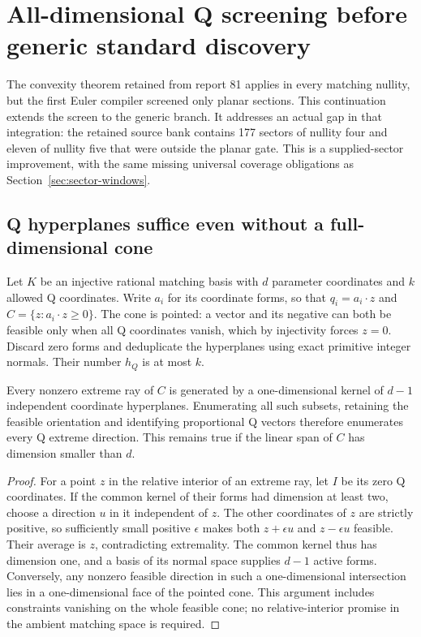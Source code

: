 \section{All-dimensional Q screening before generic standard discovery}
\label{sec:generic-euler}

The convexity theorem retained from report 81 applies in every matching
nullity, but the first Euler compiler screened only planar sections.
This continuation extends the screen to the generic branch. It addresses
an actual gap in that integration: the retained source bank contains 177
sectors of nullity four and eleven of nullity five that were outside the
planar gate. This is a supplied-sector improvement, with the same missing
universal coverage obligations as Section~\ref{sec:sector-windows}.

\subsection{Q hyperplanes suffice even without a full-dimensional cone}

Let $K$ be an injective rational matching basis with $d$ parameter coordinates
and $k$ allowed Q coordinates. Write $a_i$ for its coordinate forms, so that
$q_i=a_i\cdot z$ and $C=\{z:a_i\cdot z\ge0\}$.
The cone is pointed: a vector and its negative can both be feasible only
when all Q coordinates vanish, which by injectivity forces $z=0$.
Discard zero forms and deduplicate the hyperplanes using exact primitive
integer normals. Their number $h_Q$ is at most $k$.

\begin{proposition}
Every nonzero extreme ray of $C$ is generated by a one-dimensional kernel
of $d-1$ independent coordinate hyperplanes. Enumerating all such subsets,
retaining the feasible orientation and identifying proportional Q vectors
therefore enumerates every Q extreme direction. This remains true if the
linear span of $C$ has dimension smaller than $d$.
\end{proposition}
\begin{proof}
For a point $z$ in the relative interior of an extreme ray, let $I$ be its
zero Q coordinates. If the common kernel of their forms had dimension
at least two, choose a direction $u$ in it independent of $z$. The other
coordinates of $z$ are strictly positive, so sufficiently small positive
$\epsilon$ makes both $z+\epsilon u$ and $z-\epsilon u$ feasible. Their
average is $z$, contradicting extremality. The common kernel thus has
dimension one, and a basis of its normal space supplies $d-1$ active forms.
Conversely, any nonzero feasible direction in such a one-dimensional
intersection lies in a one-dimensional face of the pointed cone.
This argument includes constraints vanishing on the whole feasible cone;
no relative-interior promise in the ambient matching space is required.
\end{proof}

